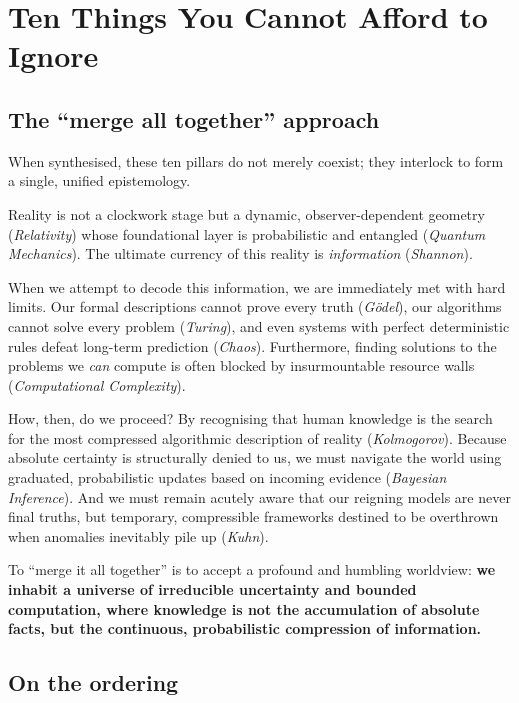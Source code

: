 \chapter{Ten Things You Cannot Afford to Ignore}

\begingroup

\section{The ``merge all together'' approach}

When synthesised, these ten pillars do not merely coexist; they interlock to form a single, unified epistemology.

Reality is not a clockwork stage but a dynamic, observer-dependent geometry (\emph{Relativity}) whose foundational layer is probabilistic and entangled (\emph{Quantum Mechanics}). The ultimate currency of this reality is \emph{information} (\emph{Shannon}).

When we attempt to decode this information, we are immediately met with hard limits. Our formal descriptions cannot prove every truth (\emph{G\"odel}), our algorithms cannot solve every problem (\emph{Turing}), and even systems with perfect deterministic rules defeat long-term prediction (\emph{Chaos}). Furthermore, finding solutions to the problems we \emph{can} compute is often blocked by insurmountable resource walls (\emph{Computational Complexity}).

How, then, do we proceed? By recognising that human knowledge is the search for the most compressed algorithmic description of reality (\emph{Kolmogorov}). Because absolute certainty is structurally denied to us, we must navigate the world using graduated, probabilistic updates based on incoming evidence (\emph{Bayesian Inference}). And we must remain acutely aware that our reigning models are never final truths, but temporary, compressible frameworks destined to be overthrown when anomalies inevitably pile up (\emph{Kuhn}).

To ``merge it all together'' is to accept a profound and humbling worldview: \textbf{we inhabit a universe of irreducible uncertainty and bounded computation, where knowledge is not the accumulation of absolute facts, but the continuous, probabilistic compression of information.}

\section{On the ordering}

